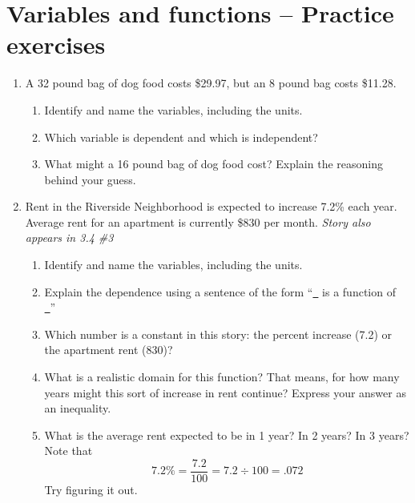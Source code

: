 
\section{Variables and functions  -- Practice exercises}
\begin{enumerate}

\item A 32 pound bag of dog food costs \$29.97, but an 8 pound bag costs \$11.28.  
\begin{enumerate}
\item  Identify and name the variables, including the units. \vfill
\item Which variable is dependent and which is independent? \vfill
\item What might a 16 pound bag of dog food cost? Explain the reasoning behind your guess.  
\end{enumerate} %
 \vfill \vfill
 
\newpage %

\item Rent in the Riverside Neighborhood is expected to increase 7.2\% each year.  Average rent for an apartment is currently \$830 per month.  \hfill \emph{Story also appears in 3.4 \#3} 
\begin{enumerate}
\item Identify and name the variables, including the units. \vfill
\item Explain the dependence using a sentence of the form ``\underline{~\quad} is a function of \underline{~\quad}'' \bigskip
\item Which number is a constant in this story:  the percent increase (7.2) or the apartment rent (830)? \bigskip
\item What is a realistic domain for this function?  That means, for how many years might this sort of increase in rent continue?   Express your answer as an inequality. \vfill
\item What is the average rent expected to be in 1 year?  In 2 years?  In 3 years?  Note that $$7.2\% = \frac{7.2}{100} = 7.2 \div 100 = .072$$ Try figuring it out.   \vfill   \vfill
\end{enumerate}

\newpage %
 

\end{enumerate}
